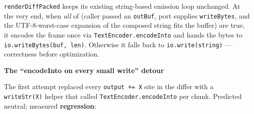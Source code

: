 \begin{itemize}
  \texttt{r\allowbreak{}e\allowbreak{}n\allowbreak{}d\allowbreak{}e\allowbreak{}r\allowbreak{}D\allowbreak{}i\allowbreak{}f\allowbreak{}f\allowbreak{}P\allowbreak{}a\allowbreak{}c\allowbreak{}k\allowbreak{}e\allowbreak{}d} keeps its existing string-based emission loop unchanged. At the very end, when \emph{all} of (caller passed an \texttt{o\allowbreak{}u\allowbreak{}t\allowbreak{}B\allowbreak{}u\allowbreak{}f}, port supplies \texttt{w\allowbreak{}r\allowbreak{}i\allowbreak{}t\allowbreak{}e\allowbreak{}B\allowbreak{}y\allowbreak{}t\allowbreak{}e\allowbreak{}s}, and the UTF-8-worst-case expansion of the composed string fits the buffer) are true, it encodes the frame once via \texttt{T\allowbreak{}e\allowbreak{}x\allowbreak{}t\allowbreak{}E\allowbreak{}n\allowbreak{}c\allowbreak{}o\allowbreak{}d\allowbreak{}e\allowbreak{}r\allowbreak{}.\allowbreak{}e\allowbreak{}n\allowbreak{}c\allowbreak{}o\allowbreak{}d\allowbreak{}e\allowbreak{}I\allowbreak{}n\allowbreak{}t\allowbreak{}o} and hands the bytes to \texttt{i\allowbreak{}o\allowbreak{}.\allowbreak{}w\allowbreak{}r\allowbreak{}i\allowbreak{}t\allowbreak{}e\allowbreak{}B\allowbreak{}y\allowbreak{}t\allowbreak{}e\allowbreak{}s\allowbreak{}(\allowbreak{}b\allowbreak{}u\allowbreak{}f\allowbreak{},\allowbreak{} \allowbreak{}l\allowbreak{}e\allowbreak{}n\allowbreak{})}. Otherwise it falls back to \texttt{i\allowbreak{}o\allowbreak{}.\allowbreak{}w\allowbreak{}r\allowbreak{}i\allowbreak{}t\allowbreak{}e\allowbreak{}(\allowbreak{}s\allowbreak{}t\allowbreak{}r\allowbreak{}i\allowbreak{}n\allowbreak{}g\allowbreak{})} --- correctness before optimization.
\end{itemize}

\textbf{The ``encodeInto on every small write'' detour}

The first attempt replaced every \texttt{o\allowbreak{}u\allowbreak{}t\allowbreak{}p\allowbreak{}u\allowbreak{}t\allowbreak{} \allowbreak{}+\allowbreak{}=\allowbreak{} \allowbreak{}X} site in the differ with a \texttt{w\allowbreak{}r\allowbreak{}i\allowbreak{}t\allowbreak{}e\allowbreak{}S\allowbreak{}t\allowbreak{}r\allowbreak{}(\allowbreak{}X\allowbreak{})} helper that called \texttt{T\allowbreak{}e\allowbreak{}x\allowbreak{}t\allowbreak{}E\allowbreak{}n\allowbreak{}c\allowbreak{}o\allowbreak{}d\allowbreak{}e\allowbreak{}r\allowbreak{}.\allowbreak{}e\allowbreak{}n\allowbreak{}c\allowbreak{}o\allowbreak{}d\allowbreak{}e\allowbreak{}I\allowbreak{}n\allowbreak{}t\allowbreak{}o} per chunk. Predicted neutral; measured \textbf{regression}:



